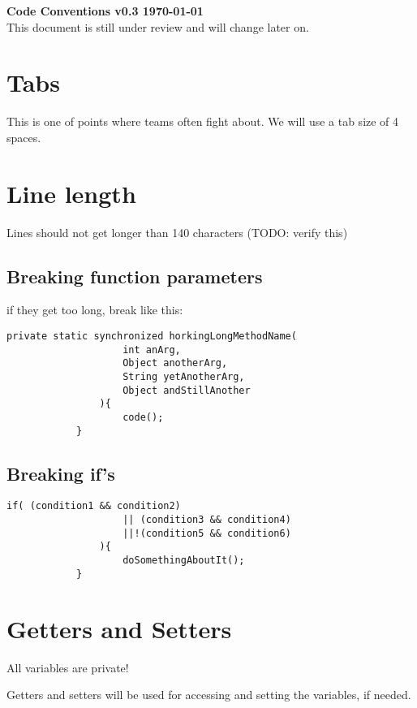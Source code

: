 \documentclass[fontsize=11,DIV=10]{scrartcl}
\begin{document}
{\Huge \bfseries Code Conventions v0.3 \hfill {\normalsize \today{}} \vspace{5pt}\\}
	This document is still under review and will change later on.

\vspace{2em}

\tableofcontents{}	

\newpage


\section{Tabs}
	This is one of points where teams often fight about.
	We will use a tab size of 4 spaces.


\section{Line length}
	Lines should not get longer than 140 characters (TODO: verify this)
	\subsection{Breaking function parameters}
		if they get too long, break like this:
		\begin{lstlisting}[tabsize=2]
			private static synchronized horkingLongMethodName(
					int anArg,
					Object anotherArg,
					String yetAnotherArg,
					Object andStillAnother
				){
					code();
			}
		\end{lstlisting}
	\subsection{Breaking if's}
		\begin{lstlisting}[tabsize=2]
			if( (condition1 && condition2)
					|| (condition3 && condition4)
					||!(condition5 && condition6)
				){
					doSomethingAboutIt();
			}
		\end{lstlisting}


\section{Getters and Setters}
	All variables are private!

	Getters and setters will be used for accessing and setting the variables, if needed.
\end{document}
